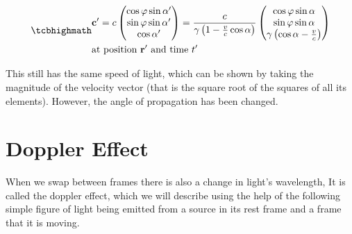 \begin{equation}
	\label{eq: velocity transform for light}
	\mhl{
		\begin{aligned}
			 & \mathbf{c}{'} =
			c
			\begin{pmatrix}
				\cos\varphi\sin\alpha{'} \\
				\sin\varphi\sin\alpha{'} \\
				\cos\alpha{'}            \\
			\end{pmatrix}
			=
			\dfrac{c}{{\gamma}\left(1-\frac{v}{c} \cos\alpha\right) }
			\begin{pmatrix}
				\cos\varphi\sin\alpha                          \\
				\sin\varphi\sin\alpha                          \\
				{\gamma} \left( \cos\alpha-\frac{v}{c} \right) \\
			\end{pmatrix}
			\\
			 & \text{at position $\mathbf{r}{'}$ and time ${t{'}}$ }
		\end{aligned}
	}
\end{equation}

This still has the same speed of light, which can be shown by taking the magnitude of the velocity vector (that is the square root of the squares of all its elements).
However, the angle of propagation has been changed.

\section{Doppler Effect} \label{sect: Doppler Effect}

When we swap between frames there is also a change in light's wavelength, It is called the doppler effect, which we will describe using the help of the following simple figure of light being emitted from a source in its rest frame and a frame that it is moving.

